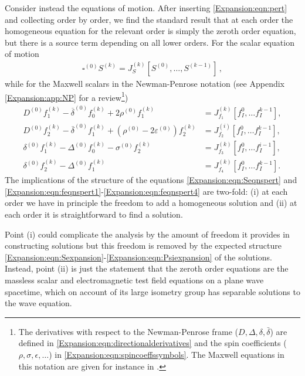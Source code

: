 Consider instead the equations of motion. After inserting \eqref{Expansion:eqn:pert} and collecting order by order, we find the standard result that at each order the homogeneous equation for the relevant order is simply the zeroth order equation, but there is a source term depending on all lower orders. For the scalar equation of motion
\begin{equation}\label{Expansion:eqn:Seqnspert}
\begin{aligned}
\square^{(0)}S^{(k)} = J_S^{(k)}[S^{(0)}, \ldots, S^{(k-1)}] \, ,
\end{aligned}
\end{equation}
while for the Maxwell scalars in the Newman-Penrose notation (see Appendix \ref{Expansion:app:NP} for a review\footnote{The derivatives with respect to the Newman-Penrose frame ($D, \Delta, \delta, \bar{\delta}$) are defined in \eqref{Expansion:eqn:directionalderivatives} and  the spin coefficients ($\rho, \sigma, \epsilon, \ldots$) in \eqref{Expansion:eqn:spincoeffssymbols}. The Maxwell equations in this notation are given for instance in \cite{Stephani:2003tm}.})
\begin{align}
D^{(0)} f^{(k)}_{1} - \overline{\delta}^{(0)} f^{(k)}_{0} + 2 \rho^{(0)} f^{(k)}_{1} &=  J^{(k)}_{f_1}[f^{0}_I, \ldots f^{k-1}_I], \label{Expansion:eqn:feqnspert1} \\
D^{(0)} f^{(k)}_{2} - \overline{\delta}^{(0)} f^{(k)}_{1} +  \left(\rho^{(0)} - 2 \varepsilon^{(0)}\right) f^{(k)}_{2} &= J^{(i)}_{f_2}[f^{0}_I, \ldots f^{k-1}_I], \label{Expansion:eqn:feqnspert2} \\
\delta^{(0)} f^{(k)}_{1} - \Delta^{(0)} f^{(k)}_{0}- \sigma^{(0)} f^{(k)}_{2}&=  J^{(k)}_{f_3}[f^{0}_I, \ldots f^{i-1}_I], \label{Expansion:eqn:feqnspert3} \\
\delta^{(0)} f^{(k)}_{2} - \Delta^{(0)} f^{(k)}_{1} &=   J^{(k)}_{f_4}[f^{0}_I, \ldots f^{k-1}_I] . \label{Expansion:eqn:feqnspert4}
\end{align}
The implications of the structure of the equations \eqref{Expansion:eqn:Seqnspert} and \eqref{Expansion:eqn:feqnspert1}-\eqref{Expansion:eqn:feqnspert4} are two-fold: (i) at each order we have in principle the freedom to add a homogeneous solution and (ii) at each order it is straightforward to find a solution. 

Point (i) could complicate the analysis by the amount of freedom it provides in constructing solutions but this freedom is removed by the expected structure  \eqref{Expansion:eqn:Sexpansion}-\eqref{Expansion:eqn:Psiexpansion} of the solutions. Instead, point (ii) is just the statement that the zeroth order equations are the massless scalar and electromagnetic test field equations on a plane wave spacetime, which on account of its large isometry group has separable solutions to the wave equation.  

